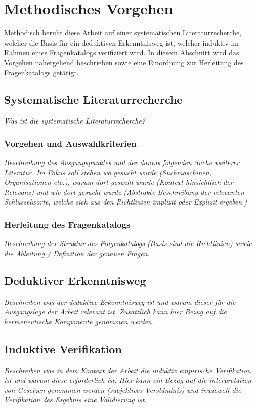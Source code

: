 \documentclass[11pt,a4paper,hidelinks]{article}   %
\begin{document}
    \newpage
    \section{Methodisches Vorgehen}
        Methodisch beruht diese Arbeit auf einer systematischen Literaturrecherche, welcher die Basis für ein deduktiven Erkenntnisweg ist, welcher induktiv im Rahmen eines Fragenkatalogs verifiziert wird. In diesem Abschnitt wird das Vorgehen nähergehend beschrieben sowie eine Einordnung zur Herleitung des Fragenkatalogs getätigt.
        \subsection{Systematische Literaturrecherche}
            \emph{Was ist die systematische Literaturrecherche?}
            \subsubsection{Vorgehen und Auswahlkriterien}
                \emph{Beschreibung des Ausgangspunktes und der daraus folgenden Suche weiterer Literatur. Im Fokus soll stehen wo gesucht wurde (Suchmaschinen, Organisationen etc.), warum dort gesucht wurde (Kontext hinsichtlich der Relevanz) und wie dort gesucht wurde (Abstrakte Beschreibung der relevanten Schlüsselworte, welche sich aus den Richtlinien implizit oder Explizit ergeben.)}
            \subsubsection{Herleitung des Fragenkatalogs}
                \emph{Beschreibung der Struktur des Fragenkatalogs (Basis sind die Richtlinien) sowie die Ableitung / Definition der genauen Fragen.}
        \subsection{Deduktiver Erkenntnisweg}
            \emph{Beschreiben was der deduktive Erkenntnisweg ist und warum dieser für die Ausgangslage der Arbeit relevant ist. Zusätzlich kann hier Bezug auf die hermeneutische Komponente genommen werden.}
        \subsection{Induktive Verifikation}
            \emph{Beschreiben was in dem Kontext der Arbeit die induktiv empirische Verifikation ist und warum diese erforderlich ist. Hier kann ein Bezug auf die interpretation von Gesetzen genommen werden (subjektives Verständnis) und inwieweit die Verifikation des Ergebnis eine Validierung ist.}
\end{document}

